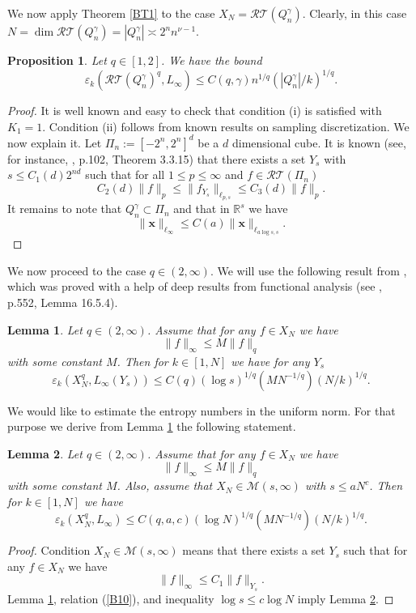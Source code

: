 \documentclass[12pt]{article}
\def \Tr{\mathcal T}
\def \cR{\mathcal R}
\def \cM{\mathcal M}
\def\R{{\mathbb R}}
\def \e{\varepsilon}
\def\ga{\gamma}
\def\bx{\mathbf x}
\newtheorem{Lemma}{Lemma}[section]
\newtheorem{Proposition}{Proposition}[section]
\numberwithin{equation}{section}
\newcommand{\be}{\begin{equation}}
\newcommand{\ee}{\end{equation}}
\begin{document}
We now apply Theorem \ref{BT1} to the case $X_N=\cR\Tr(Q_n^\ga)$. Clearly, in this case 
$N=\dim \cR\Tr(Q_n^\ga) = |Q_n^\ga| \asymp 2^n n^{\nu-1}$. 

\begin{Proposition}\label{BP1} Let $q\in [1,2]$. We have the bound
\be\label{B4}
\e_k(\cR\Tr(Q_n^\ga)^q,L_\infty) \le C(q,\ga) n^{1/q} (|Q_n^\ga|/k)^{1/q}.
\ee
\end{Proposition}
\begin{proof} It is well known and easy to check that condition (i) is satisfied with $K_1=1$. 
Condition (ii) follows from known results on sampling discretization. We now explain it.
Let $\Pi_n := [-2^n,2^n]^d$ be a $d$ dimensional cube. It is known (see, for instance, \cite{VTbookMA}, p.102, Theorem 3.3.15) that there exists a set $Y_s$ with $s \le C_1(d)2^{nd}$ such that for all $1\le p\le \infty$ and $f\in \cR\Tr(\Pi_n)$
\be\label{B5}
C_2(d)\|f\|_p \le \|f_{Y_s}\|_{\ell_{p,s}} \le C_3(d)\|f\|_p.
\ee
It remains to note that $Q_n^\ga \subset \Pi_n$ and that in $\R^s$ we have 
\be\label{B6}
\|\bx\|_{\ell_\infty} \le C(a) \|\bx\|_{\ell_{a\log s,s}}.
\ee
\end{proof}

We now proceed to the case $q\in (2,\infty)$. We will use the following result from \cite{Kos},
which was proved with a help of deep results from functional analysis (see \cite{Tal}, p.552, Lemma 16.5.4). 

\begin{Lemma}\label{BL1} Let $q\in (2,\infty)$. Assume that for any $f\in X_N$ we have
\be\label{B6'}
\|f\|_\infty \le M\|f\|_q
\ee
with some constant $M$. Then for $k\in [1,N]$ we have for any $Y_s$
\be\label{B7}
\e_k(X_N^q, L_\infty(Y_s)) \le C(q)(\log s)^{1/q} (MN^{-1/q})(N/k)^{1/q} .
\ee
\end{Lemma}

We would like to estimate the entropy numbers in the uniform norm. For that purpose we derive 
from Lemma \ref{BL1} the following statement.

\begin{Lemma}\label{BL2} Let $q\in (2,\infty)$. Assume that for any $f\in X_N$ we have
\be\label{B8}
\|f\|_\infty \le M\|f\|_q
\ee
with some constant $M$. Also, assume that $X_N \in \cM(s,\infty)$ with $s\le aN^c$.
Then for $k\in [1,N]$ we have  
\be\label{B9}
\e_k(X_N^q, L_\infty) \le C(q,a,c)(\log N)^{1/q} (MN^{-1/q})(N/k)^{1/q} .
\ee
\end{Lemma}
\begin{proof} Condition $X_N \in \cM(s,\infty)$ means that there exists a set $Y_s$ such that for any $f\in X_N$ we have
\be\label{B10}
\|f\|_\infty \le C_1\|f\|_{Y_s}.
\ee
Lemma \ref{BL1}, relation (\ref{B10}), and inequality $\log s \le c\log N$ imply Lemma \ref{BL2}.

\end{proof}
\end{document}
